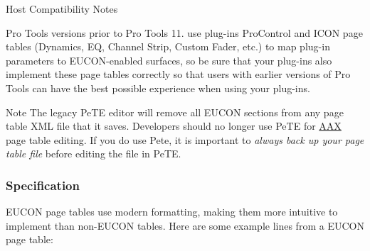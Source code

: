  \begin{DoxyRefDesc}{Host Compatibility Notes}
\item[\mbox{\hyperlink{a00786__compatibility_notes000021}{Host Compatibility Notes}}]Pro Tools versions prior to Pro Tools 11. use plug-\/ins\textquotesingle{} Pro\+Control and I\+C\+ON page tables (Dynamics, EQ, Channel Strip, Custom Fader, etc.) to map plug-\/in parameters to E\+U\+C\+O\+N-\/enabled surfaces, so be sure that your plug-\/ins also implement these page tables correctly so that users with earlier versions of Pro Tools can have the best possible experience when using your plug-\/ins.\end{DoxyRefDesc}


\begin{DoxyNote}{Note}
The legacy Pe\+TE editor will remove all E\+U\+C\+ON sections from any page table X\+ML file that it saves. Developers should no longer use Pe\+TE for \mbox{\hyperlink{a00852}{A\+AX}} page table editing. If you do use Pete, it is important to {\itshape always back up your page table file} before editing the file in Pe\+TE.
\end{DoxyNote}
\hypertarget{a00833_subsection_eucon_page_tables_specification}{}\subsubsection{Specification}\label{a00833_subsection_eucon_page_tables_specification}
E\+U\+C\+ON page tables use modern formatting, making them more intuitive to implement than non-\/\+E\+U\+C\+ON tables. Here are some example lines from a E\+U\+C\+ON page table\+:


\begin{DoxyCode}{0}
\end{DoxyCode}


